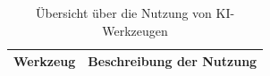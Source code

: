 \begin{table}[htbp]
	\centering
	\caption{Übersicht über die Nutzung von KI-Werkzeugen}
	\label{tab:ki-werkzeuge}
	\begin{tabularx}{\textwidth}{@{}lX@{}}
		\toprule
		\textbf{Werkzeug} & \textbf{Beschreibung der Nutzung} \\
		\midrule
		
		
		
		\bottomrule
	\end{tabularx}
\end{table}
